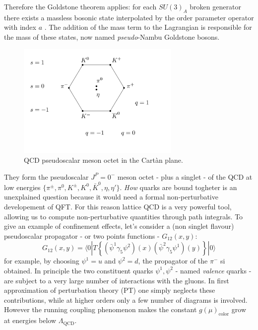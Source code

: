 \documentclass[english, LaM, oneside, noexaminfo]{sapthesis}
\newcommand{\la}{\langle}
\newcommand{\ra}{\rangle}
\begin{document}
Therefore the Goldstone theorem applies: for each $SU(3)_A$ broken generator there exists a massless bosonic state interpolated by the order parameter operator with index $a$ \cite{Goldstone-Theorem}.
The addition of the mass term to the Lagrangian is responsible for the mass of these states, now named {\it pseudo}-Nambu Goldstone bosons.
\begin{figure}[!h]
    \centering
    \includegraphics[width=0.7\textwidth]{imgs-MSc-thesis/ottuplice_via.pdf}
    \caption{QCD pseudoscalar meson octet in the Cartàn plane.}
    \label{fig:meson_octet}
\end{figure}
\newline
They form the pseudoscalar $J^P = 0^-$ meson octet - plus a singlet - of the QCD at low energies $\{ \pi^\pm,\pi^0,K^\pm,K^0,\bar K^0,\eta,\eta' \}$.
\textit{How} quarks are bound togheter is an unexplained question because it would need a formal non-perturbative developement of QFT.
For this reason lattice QCD is a very powerful tool, allowing us to compute non-perturbative quantities through path integrals.
\newline
To give an example of confinement effects, let's consider a (non singlet flavour) pseudoscalar propagator - or two points functions - $G_{12}(x,y)$:
\begin{equation*}
    G_{12}(x,y) = \la 0 | T \left\{ ( \bar\psi^1 \gamma_5 \psi^2 )(x) ( \bar\psi^2 \gamma_5 \psi^1 )(y) \right\} | 0 \ra
\end{equation*}
for example, by choosing $\psi^1 = u$ and $\psi^2 = d$, the propagator of the $\pi^-$ si obtained.
In principle the two constituent quarks $\psi^1, \psi^2$ - named \textit{valence} quarks - are subject to a very large number of interactions with the gluons.
In first approximation of perturbation theory (PT) one simply neglects these contributions, while at higher orders only a few number of diagrams is involved.
However the running coupling phenomenon makes the constant $g(\mu)_\text{color}$ grow at energies below $\Lambda_\text{QCD}$. 
\end{document}
